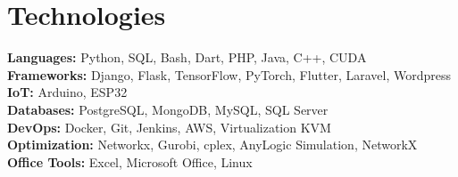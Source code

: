 \documentclass[10pt, letterpaper]{article}
\begin{document}









\section*{Technologies}
\begin{multicols}{2}
    \textbf{Languages:} Python, SQL, Bash, Dart, PHP, Java, C++, CUDA \\
    \textbf{Frameworks:} Django, Flask, TensorFlow, PyTorch, Flutter, Laravel, Wordpress \\
    \textbf{IoT:} Arduino, ESP32 \\
    \textbf{Databases:} PostgreSQL, MongoDB, MySQL, SQL Server \\
    \textbf{DevOps:} Docker, Git, Jenkins, AWS, Virtualization KVM \\
    \textbf{Optimization:} Networkx, Gurobi, cplex, AnyLogic Simulation, NetworkX \\
    \textbf{Office Tools:} Excel, Microsoft Office, Linux
\end{multicols}


    
\end{document}
